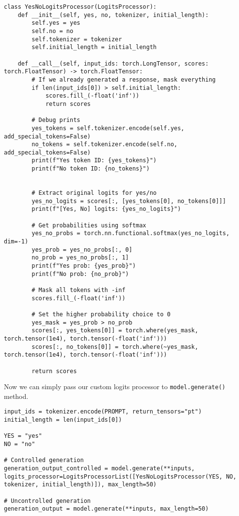 \begin{verbatim}
class YesNoLogitsProcessor(LogitsProcessor):
    def __init__(self, yes, no, tokenizer, initial_length):
        self.yes = yes
        self.no = no
        self.tokenizer = tokenizer
        self.initial_length = initial_length
        
    def __call__(self, input_ids: torch.LongTensor, scores: torch.FloatTensor) -> torch.FloatTensor:
        # If we already generated a response, mask everything
        if len(input_ids[0]) > self.initial_length:
            scores.fill_(-float('inf'))
            return scores
            
        # Debug prints
        yes_tokens = self.tokenizer.encode(self.yes, add_special_tokens=False)
        no_tokens = self.tokenizer.encode(self.no, add_special_tokens=False)
        print(f"Yes token ID: {yes_tokens}")
        print(f"No token ID: {no_tokens}")
        
        
        # Extract original logits for yes/no
        yes_no_logits = scores[:, [yes_tokens[0], no_tokens[0]]]
        print(f"[Yes, No] logits: {yes_no_logits}")
        
        # Get probabilities using softmax
        yes_no_probs = torch.nn.functional.softmax(yes_no_logits, dim=-1)
        yes_prob = yes_no_probs[:, 0]
        no_prob = yes_no_probs[:, 1]
        print(f"Yes prob: {yes_prob}")
        print(f"No prob: {no_prob}")
        
        # Mask all tokens with -inf
        scores.fill_(-float('inf'))
        
        # Set the higher probability choice to 0
        yes_mask = yes_prob > no_prob
        scores[:, yes_tokens[0]] = torch.where(yes_mask, torch.tensor(1e4), torch.tensor(-float('inf')))
        scores[:, no_tokens[0]] = torch.where(~yes_mask, torch.tensor(1e4), torch.tensor(-float('inf')))
        
        return scores
\end{verbatim}

Now we can simply pass our custom logits processor to \texttt{model.generate()} method.

\begin{verbatim}
input_ids = tokenizer.encode(PROMPT, return_tensors="pt")
initial_length = len(input_ids[0])

YES = "yes"
NO = "no"

# Controlled generation
generation_output_controlled = model.generate(**inputs, logits_processor=LogitsProcessorList([YesNoLogitsProcessor(YES, NO, tokenizer, initial_length)]), max_length=50)

# Uncontrolled generation
generation_output = model.generate(**inputs, max_length=50)
\end{verbatim}

